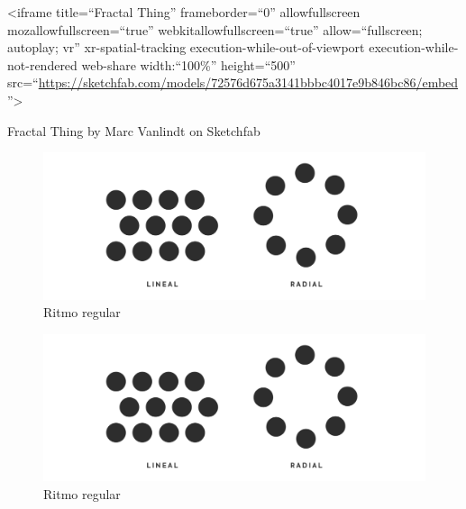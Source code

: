 \documentclass[16pt,]{krantz}
\theoremstyle{definition}
\theoremstyle{definition}
\theoremstyle{definition}
\theoremstyle{definition}
\theoremstyle{remark}
\begin{document}
\textless{}iframe title=``Fractal Thing'' frameborder=``0'' allowfullscreen mozallowfullscreen=``true'' webkitallowfullscreen=``true'' allow=``fullscreen; autoplay; vr'' xr-spatial-tracking execution-while-out-of-viewport execution-while-not-rendered web-share width:``100\%'' height=``500'' src=``\url{https://sketchfab.com/models/72576d675a3141bbbc4017e9b846bc86/embed}''\textgreater{}

Fractal Thing by Marc Vanlindt on Sketchfab

\begin{figure}

{\centering \includegraphics[width=1\linewidth,height=1\textheight]{ritmo} 

}

\caption{Ritmo regular}\label{fig:ritmo}
\end{figure}

\begin{figure}

{\centering \includegraphics[width=1\linewidth,height=1\textheight]{ritmo} 

}

\caption{Ritmo regular}\label{fig:rythm}
\end{figure}
\end{document}
